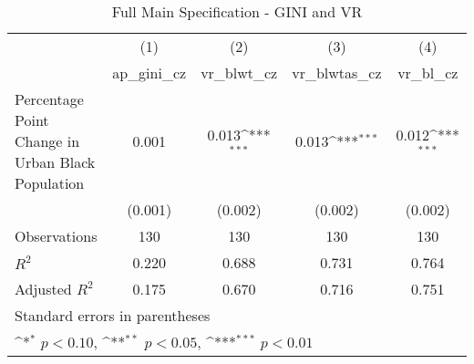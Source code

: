 \begin{table}[htbp]\centering
\def\sym#1{\ifmmode^{#1}\else\(^{#1}\)\fi}
\caption{Full Main Specification - GINI and VR}
\begin{tabular}{l*{4}{c}}
\hline\hline
                    &\multicolumn{1}{c}{(1)}&\multicolumn{1}{c}{(2)}&\multicolumn{1}{c}{(3)}&\multicolumn{1}{c}{(4)}\\
                    &\multicolumn{1}{c}{ap\_gini\_cz}&\multicolumn{1}{c}{vr\_blwt\_cz}&\multicolumn{1}{c}{vr\_blwtas\_cz}&\multicolumn{1}{c}{vr\_bl\_cz}\\
\hline
Percentage Point Change in Urban Black Population&       0.001         &       0.013\sym{***}&       0.013\sym{***}&       0.012\sym{***}\\
                    &     (0.001)         &     (0.002)         &     (0.002)         &     (0.002)         \\
\hline
Observations        &         130         &         130         &         130         &         130         \\
\(R^{2}\)           &       0.220         &       0.688         &       0.731         &       0.764         \\
Adjusted \(R^{2}\)  &       0.175         &       0.670         &       0.716         &       0.751         \\
\hline\hline
\multicolumn{5}{l}{\footnotesize Standard errors in parentheses}\\
\multicolumn{5}{l}{\footnotesize \sym{*} \(p<0.10\), \sym{**} \(p<0.05\), \sym{***} \(p<0.01\)}\\
\end{tabular}
\end{table}
